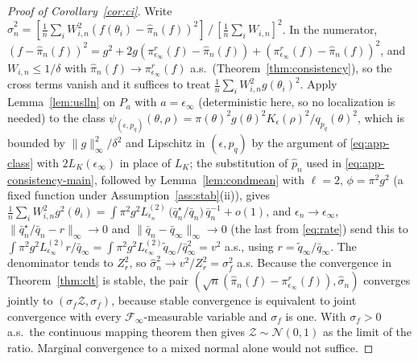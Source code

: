 \documentclass[10pt]{article}
\theoremstyle{plain}
\theoremstyle{definition}
\begin{document}
\begin{proof}[Proof of Corollary~\ref{cor:ci}]
Write $\widehat\sigma^2_n=[\tfrac1n\sum_iW^2_{i,n}(f(\theta_i)-\widehat\pi_n(f))^2]\,/\,[\tfrac1n\sum_iW_{i,n}]^2$. In the numerator, $(f-\widehat\pi_n(f))^2=g^2+2g(\pi^r_{\epsilon_\infty}(f)-\widehat\pi_n(f))+(\pi^r_{\epsilon_\infty}(f)-\widehat\pi_n(f))^2$, and $W_{i,n}\le1/\delta$ with $\widehat\pi_n(f)\to\pi^r_{\epsilon_\infty}(f)$ a.s.\ (Theorem~\ref{thm:consistency}), so the cross terms vanish and it suffices to treat $\tfrac1n\sum_iW^2_{i,n}g(\theta_i)^2$. Apply Lemma~\ref{lem:uslln} on $P_{a}$ with $a=\epsilon_\infty$ (deterministic here, so no localization is needed) to the class $\psi_{(\epsilon,p_q)}(\theta,\rho)=\pi(\theta)^2g(\theta)^2K_\epsilon(\rho)^2/q_{p_q}(\theta)^2$, which is bounded by $\|g\|^2_\infty/\delta^2$ and Lipschitz in $(\epsilon,p_q)$ by the argument of \eqref{eq:app-class} with $2L_K(\epsilon_\infty)$ in place of $L_K$; the substitution of $\widehat p_n$ used in \eqref{eq:app-consistency-main}, followed by Lemma~\ref{lem:condmean} with $\ell=2$, $\phi=\pi^2g^2$ (a fixed function under Assumption~\ref{ass:stab}(ii)), gives
$\tfrac1n\sum_iW^2_{i,n}g^2(\theta_i)=\int\pi^2g^2L^{(2)}_{\epsilon_n}\,\bigl(\bar q^\star_n/\bar q_n\bigr)\,\bar q_n^{-1}+o(1)$,
and $\epsilon_n\to\epsilon_\infty$, $\|\bar q^\star_n/\bar q_n-r\|_\infty\to0$ and $\|\bar q_n-\bar q_\infty\|_\infty\to0$ (the last from \eqref{eq:rate}) send this to $\int\pi^2g^2L^{(2)}_{\epsilon_\infty}r/\bar q_\infty=\int\pi^2g^2L^{(2)}_{\epsilon_\infty}\tilde q_\infty/\bar q^2_\infty=v^2$ a.s., using $r=\tilde q_\infty/\bar q_\infty$. The denominator tends to $Z^2_r$, so $\widehat\sigma^2_n\to v^2/Z^2_r=\sigma^2_f$ a.s. Because the convergence in Theorem~\ref{thm:clt} is stable, the pair $(\sqrt n(\widehat\pi_n(f)-\pi^r_{\epsilon_\infty}(f)),\widehat\sigma_n)$ converges jointly to $(\sigma_f\mathcal{Z},\sigma_f)$, because stable convergence is equivalent to joint convergence with every $\mathcal{F}_\infty$-measurable variable and $\sigma_f$ is one. With $\sigma_f>0$ a.s.\ the continuous mapping theorem then gives $\mathcal{Z}\sim\mathcal{N}(0,1)$ as the limit of the ratio. Marginal convergence to a mixed normal alone would not suffice.
\end{proof}
\end{document}
